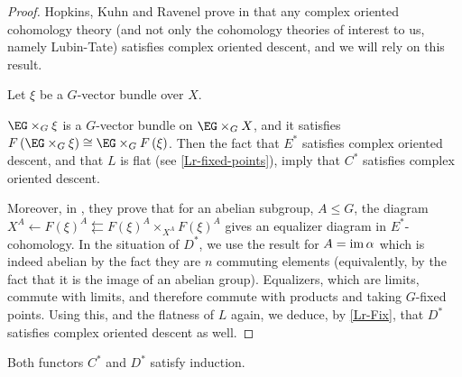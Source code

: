\begin{proof}
	Hopkins, Kuhn and Ravenel prove in \cite[2.5]{HKR} that any complex oriented cohomology theory (and not only the cohomology theories of interest to us, namely Lubin-Tate) satisfies complex oriented descent, and we will rely on this result.
	
	Let $\xi$ be a $G$-vector bundle over $X$.
	
	$\EG \times_G \xi$ is a $G$-vector bundle on $\EG \times_G X$, and it satisfies $F\left(\EG \times_G \xi\right) \cong \EG \times_G F\left(\xi\right)$.
	Then the fact that $E^*$ satisfies complex oriented descent, and that $L$ is flat (see \cref{Lr-fixed-points}), imply that $C^*$ satisfies complex oriented descent.
	
	Moreover, in \cite[2.6]{HKR}, they prove that for an abelian subgroup, $A \leq G$, the diagram $X^A \leftarrow F\left(\xi\right)^A \leftleftarrows F\left(\xi\right)^A \times_{X^A} F\left(\xi\right)^A$ gives an equalizer diagram in $E^*$-cohomology.
	In the situation of $D^*$, we use the result for $A = \operatorname{im} \alpha$ which is indeed abelian by the fact they are $n$ commuting elements (equivalently, by the fact that it is the image of an abelian group).
	Equalizers, which are limits, commute with limits, and therefore commute with products and taking $G$-fixed points.
	Using this, and the flatness of $L$ again, we deduce, by \cref{Lr-Fix}, that $D^*$ satisfies complex oriented descent as well.
\end{proof}

\begin{lemma}
	Both functors $C^*$ and $D^*$ satisfy induction.
\end{lemma}

